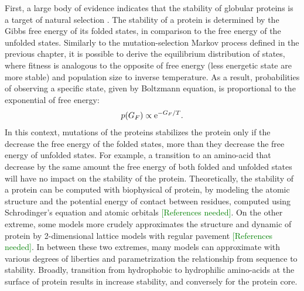 First, a large body of evidence indicates that the stability of globular proteins is a target of natural selection \citep{Sikosek2014}.
The stability of a protein is determined by the Gibbs free energy of its folded states, in comparison to the free energy of the unfolded states.
Similarly to the mutation-selection Markov process defined in the previous chapter, it is possible to derive the equilibrium distribution of states, where fitness is analogous to the opposite of free energy (less energetic state are more stable) and population size to inverse temperature.
As a result, probabilities of observing a specific state, given by Boltzmann equation, is proportional to the exponential of free energy:
\begin{align}
	p(G_F)\propto \mathrm{e}^{- G_F / T}.
\end{align}
In this context, mutations of the proteins stabilizes the protein only if the decrease the free energy of the folded states, more than they decrease the free energy of unfolded states.
For example, a {transition} to an amino-acid that decrease by the same amount the free energy of both folded and unfolded states will have no impact on the stability of the protein.
Theoretically, the stability of a protein can be computed with biophysical of protein, by modeling the atomic structure and the potential energy of contact between residues, computed using Schrodinger's equation and atomic orbitals \textcolor{GREEN}{[References needed]}.
On the other extreme, some models more crudely approximates the structure and dynamic of protein by 2-dimensional lattice models with regular pavement \textcolor{GREEN}{[References needed]}. 
In between these two extremes, many models can approximate with various degrees of liberties and parametrization the relationship from sequence to stability.
Broadly, {transition} from hydrophobic to hydrophilic amino-acids at the surface of protein results in increase stability, and conversely for the protein core.

